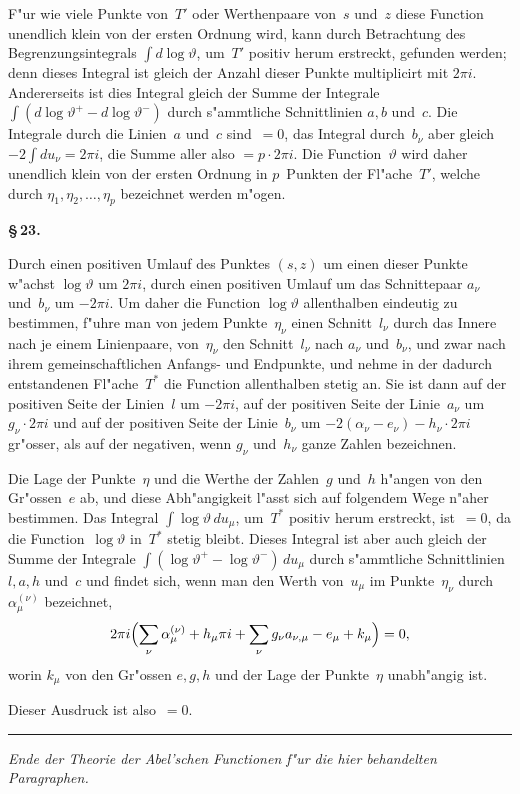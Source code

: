 \documentclass[12pt,a4paper]{article}
\begin{document}
F"ur wie viele Punkte von~$T'$ oder Werthenpaare von~$s$ und~$z$
diese Function unendlich klein von der ersten Ordnung wird, kann durch
Betrachtung des Begrenzungsintegrals $\int d\log\vartheta$, um~$T'$ positiv herum
erstreckt, gefunden werden; denn dieses Integral ist gleich der Anzahl
dieser Punkte multiplicirt mit $2\pi i$. Andererseits ist dies Integral
gleich der Summe der Integrale $\int (d\log\vartheta^+ - d\log\vartheta^-)$ durch
s"ammtliche Schnittlinien $a, b$ und~$c$. Die Integrale durch die Linien~$a$
und~$c$ sind~$= 0$, das Integral durch~$b_\nu$ aber gleich $-2 \int du_\nu = 2\pi i$,
die Summe aller also $= p \cdot 2\pi i$. Die Function~$\vartheta$ wird daher
unendlich klein von der ersten Ordnung in $p$~Punkten der Fl"ache~$T'$,
welche durch $\eta_1, \eta_2, \ldots, \eta_p$ bezeichnet werden m"ogen.

\medskip
\textbf{\S\,23.}

Durch einen positiven Umlauf des Punktes $(s,z)$ um einen dieser
Punkte w"achst $\log\vartheta$ um $2\pi i$, durch einen positiven Umlauf um das
Schnittepaar $a_\nu$ und~$b_\nu$ um $-2\pi i$. Um daher die Function
$\log\vartheta$ allenthalben eindeutig zu bestimmen, f"uhre man von jedem
Punkte~$\eta_\nu$ einen Schnitt~$l_\nu$ durch das Innere nach je einem
Linienpaare, von~$\eta_\nu$ den Schnitt~$l_\nu$ nach $a_\nu$ und~$b_\nu$, und
zwar nach ihrem gemeinschaftlichen Anfangs- und Endpunkte, und nehme
in der dadurch entstandenen Fl"ache~$T^*$ die Function allenthalben stetig
an. Sie ist dann auf der positiven Seite der Linien~$l$ um $-2\pi i$,
auf der positiven Seite der Linie~$a_\nu$ um $g_\nu \cdot 2\pi i$ und auf der
positiven Seite der Linie~$b_\nu$ um $-2(\alpha_\nu - e_\nu) - h_\nu \cdot 2\pi i$
gr"osser, als auf der negativen, wenn $g_\nu$ und~$h_\nu$ ganze Zahlen bezeichnen.

Die Lage der Punkte~$\eta$ und die Werthe der Zahlen~$g$ und~$h$
h"angen von den Gr"ossen~$e$ ab, und diese Abh"angigkeit l"asst sich auf
folgendem Wege n"aher bestimmen. Das Integral $\int \log\vartheta\, du_\mu$,
um~$T^*$ positiv herum erstreckt, ist~$= 0$, da die Function~$\log\vartheta$
in~$T^*$ stetig bleibt. Dieses Integral ist aber auch gleich der Summe
der Integrale $\int (\log\vartheta^+ - \log\vartheta^-)\, du_\mu$ durch s"ammtliche
Schnittlinien $l, a, h$ und~$c$ und findet sich, wenn man den Werth von~$u_\mu$
im Punkte~$\eta_\nu$ durch~$\alpha_\mu^{(\nu)}$ bezeichnet,
\[
2\pi i \Bigl(\sum_\nu \alpha_\mu^{(\nu)} + h_\mu \pi i + \sum_\nu g_\nu a_{\nu,\mu}
  - e_\mu + k_\mu\Bigr) = 0,
\]
worin $k_\mu$ von den Gr"ossen $e, g, h$ und der Lage der Punkte~$\eta$
unabh"angig ist.

Dieser Ausdruck ist also~$= 0$.

\bigskip
\begin{center}
\rule{0.5\textwidth}{0.4pt}
\end{center}

\vfill
\begin{center}
\textit{Ende der Theorie der Abel'schen Functionen f"ur die hier behandelten
Paragraphen.}
\end{center}
\end{document}
